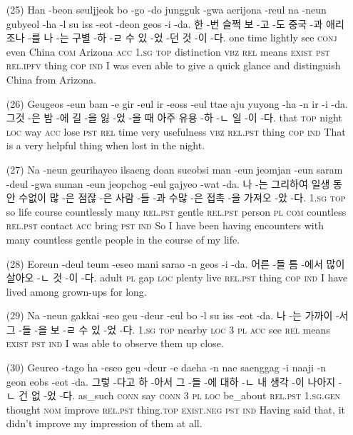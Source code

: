 \begin{itemize}
\item [(25)]
\tgl
		{Han -beon seuljjeok bo -go -do jungguk -gwa aerijona -reul na -neun gubyeol -ha -l su iss -eot -deon geos -i -da.}
		{한 -번 슬쩍 보 -고 -도 중국 -과 애리조나 -를 나 -는 구별 -하 -ㄹ 수 있 -었 -던 것 -이 -다.}
		{one	time	lightly	see	\textsc{conj}	even	China	\textsc{com}	Arizona	\textsc{acc}	\textsc{1.sg}	\textsc{top}	distinction	\textsc{vbz}	\textsc{rel}	means	\textsc{exist}	\textsc{pst}	\textsc{rel.ipfv}	thing	\textsc{cop}	\textsc{ind}}
		{I was even able to give a quick glance and distinguish China from Arizona.}

\item [(26)]
\tgl
		{Geugeos -eun bam -e gir -eul ir -eoss -eul ttae aju yuyong -ha -n ir -i -da.}
		{그것 -은 밤 -에 길 -을 잃 -었 -을 때 아주 유용 -하 -ㄴ 일 -이 -다.}
		{that	\textsc{top}	night	\textsc{loc}	way	\textsc{acc}	lose	\textsc{pst}	\textsc{rel}	time	very	usefulness	\textsc{vbz}	\textsc{rel.pst}	thing	\textsc{cop}	\textsc{ind}}
		{That is a very helpful thing when lost in the night.}

\item [(27)]
\tgl
		{Na -neun geurihayeo ilsaeng doan sueobsi man -eun jeomjan -eun saram -deul -gwa suman -eun jeopchog -eul gajyeo -wat -da.}
		{나 -는 그리하여 일생 동안 수없이 많 -은 점잖 -은 사람 -들 -과 수많 -은 접촉 -을 가져오 -았 -다.}
		{\textsc{1.sg}	\textsc{top}	so	life	course	countlessly	many	\textsc{rel.pst}	gentle	\textsc{rel.pst}	person	\textsc{pl}	\textsc{com}	countless	\textsc{rel.pst}	contact	\textsc{acc}	bring	\textsc{pst}	\textsc{ind}}
		{So I have been having encounters with many countless gentle people in the course of my life.}

\item [(28)]
\tgl
		{Eoreun -deul teum -eseo mani sarao -n geos -i -da.}
		{어른 -들 틈 -에서 많이 살아오 -ㄴ 것 -이 -다.}
		{adult	\textsc{pl}	gap	\textsc{loc}	plenty	live	\textsc{rel.pst}	thing	\textsc{cop}	\textsc{ind}}
		{I have lived among grown-ups for long.}

\pagebreak

\item [(29)]
\tgl
		{Na -neun gakkai -seo geu -deur -eul bo -l su iss -eot -da.}
		{나 -는 가까이 -서 그 -들 -을 보 -ㄹ 수 있 -었 -다.}
		{\textsc{1.sg}	\textsc{top}	nearby	\textsc{loc}	\textsc{3}	\textsc{pl}	\textsc{acc}	see	\textsc{rel}	means	\textsc{exist}	\textsc{pst}	\textsc{ind}}
		{I was able to observe them up close.}

\item [(30)]
\tgl
		{Geureo -tago ha -eseo geu -deur -e daeha -n nae saenggag -i naaji -n geon eobs -eot -da.}
		{그렇 -다고 하 -아서 그 -들 -에 대하 -ㄴ 내 생각 -이 나아지 -ㄴ 건 없 -었 -다.}
		{as\_such	\textsc{conn}	say	\textsc{conn}	\textsc{3}	\textsc{pl}	\textsc{loc}	be\_about	\textsc{rel.pst}	\textsc{1.sg.gen}	thought	\textsc{nom}	improve	\textsc{rel.pst}	thing.\textsc{top}	\textsc{exist.neg}	\textsc{pst}	\textsc{ind}}
		{Having said that, it didn't improve my impression of them at all.}


\end{itemize}
